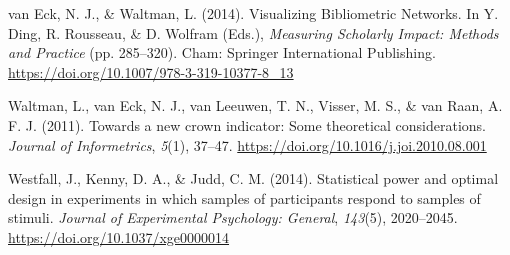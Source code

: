 \documentclass[
  man,floatsintext]{apa6}
\newlength{\cslhangindent}
\newlength{\cslentryspacingunit} %
\newenvironment{CSLReferences}[2] %
 {%
  \setlength{\parindent}{0pt}
  \ifodd #1
  \let\oldpar\par
  \def\par{\hangindent=\cslhangindent\oldpar}
  \fi
  \setlength{\parskip}{#2\cslentryspacingunit}
 }%
 {}
\begin{document}
\begin{CSLReferences}{1}{0}
\leavevmode{}%
van Eck, N. J., \& Waltman, L. (2014). Visualizing {Bibliometric Networks}. In Y. Ding, R. Rousseau, \& D. Wolfram (Eds.), \emph{Measuring {Scholarly Impact}: {Methods} and {Practice}} (pp. 285--320). {Cham}: {Springer International Publishing}. \url{https://doi.org/10.1007/978-3-319-10377-8_13}

\leavevmode{}%
Waltman, L., van Eck, N. J., van Leeuwen, T. N., Visser, M. S., \& van Raan, A. F. J. (2011). Towards a new crown indicator: {Some} theoretical considerations. \emph{Journal of Informetrics}, \emph{5}(1), 37--47. \url{https://doi.org/10.1016/j.joi.2010.08.001}

\leavevmode{}%
Westfall, J., Kenny, D. A., \& Judd, C. M. (2014). Statistical power and optimal design in experiments in which samples of participants respond to samples of stimuli. \emph{Journal of Experimental Psychology: General}, \emph{143}(5), 2020--2045. \url{https://doi.org/10.1037/xge0000014}

\end{CSLReferences}
\end{document}
